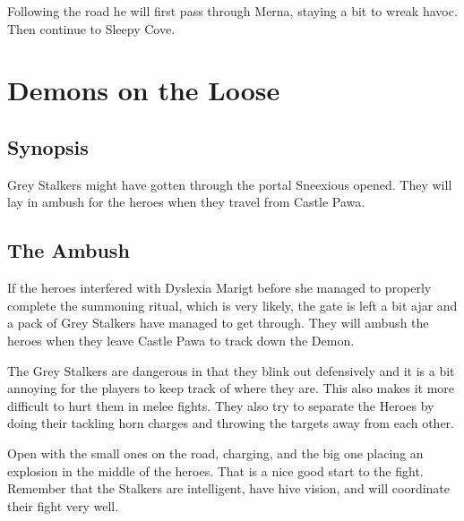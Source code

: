 \documentclass[11pt, twoside, titlepage, a4paper]{report}
\renewcommand{\chaptermark}[1]{\markboth{#1}{}}
\begin{document}
Following the road he will first pass through Merna, staying a bit to wreak havoc. Then continue to Sleepy Cove.





















\clearpage
{}
\section*{Demons on the Loose}
\chaptermark{demons}


\subsection*{Synopsis}
Grey Stalkers might have gotten through the portal Sneexious opened. They will lay in ambush for the heroes when they travel from Castle Pawa.


\subsection*{The Ambush}
If the heroes interfered with Dyslexia Marigt before she managed to properly complete the summoning ritual, which is very likely, the gate is left a bit ajar and a pack of Grey Stalkers have managed to get through. They will ambush the heroes when they leave Castle Pawa to track down the Demon.

The Grey Stalkers are dangerous in that they blink out defensively and it is a bit annoying for the players to keep track of where they are. This also makes it more difficult to hurt them in melee fights. They also try to separate the Heroes by doing their tackling horn charges and throwing the targets away from each other.

Open with the small ones on the road, charging, and the big one placing an explosion in the middle of the heroes. That is a nice good start to the fight. Remember that the Stalkers are intelligent, have hive vision, and will coordinate their fight very well.
\end{document}
